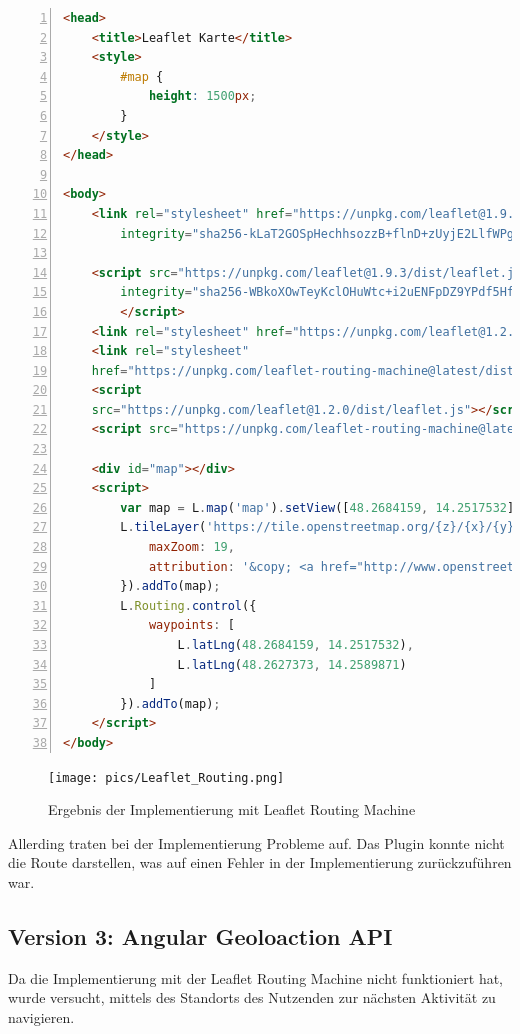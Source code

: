 \begin{lstlisting}[numbers=left,language=HTML,caption={Implementierung einer Karte mit Leaflet Routing Engine},label={lst:leafletmap}]
<head>
    <title>Leaflet Karte</title>
    <style>
        #map {
            height: 1500px;
        }
    </style>
</head>

<body>
    <link rel="stylesheet" href="https://unpkg.com/leaflet@1.9.3/dist/leaflet.css"
        integrity="sha256-kLaT2GOSpHechhsozzB+flnD+zUyjE2LlfWPgU04xyI=" crossorigin="" />

    <script src="https://unpkg.com/leaflet@1.9.3/dist/leaflet.js"
        integrity="sha256-WBkoXOwTeyKclOHuWtc+i2uENFpDZ9YPdf5Hf+D7ewM=" crossorigin="">
        </script>
    <link rel="stylesheet" href="https://unpkg.com/leaflet@1.2.0/dist/leaflet.css" />
    <link rel="stylesheet" 
    href="https://unpkg.com/leaflet-routing-machine@latest/dist/leaflet-routing-machine.css" />
    <script 
    src="https://unpkg.com/leaflet@1.2.0/dist/leaflet.js"></script>
    <script src="https://unpkg.com/leaflet-routing-machine@latest/dist/leaflet-routing-machine.js"></script>

    <div id="map"></div>
    <script>
        var map = L.map('map').setView([48.2684159, 14.2517532], 15);
        L.tileLayer('https://tile.openstreetmap.org/{z}/{x}/{y}.png', {
            maxZoom: 19,
            attribution: '&copy; <a href="http://www.openstreetmap.org/copyright">OpenStreetMap</a>'
        }).addTo(map);
        L.Routing.control({
            waypoints: [
                L.latLng(48.2684159, 14.2517532),
                L.latLng(48.2627373, 14.2589871)
            ]
        }).addTo(map);
    </script>
</body>
\end{lstlisting}

\begin{figure}[h]
    \centering
    \texttt{[image: pics/Leaflet\_Routing.png]}
    \caption{Ergebnis der Implementierung mit Leaflet Routing Machine}
\end{figure}

Allerding traten bei der Implementierung Probleme auf. Das Plugin konnte nicht die Route darstellen, was auf einen Fehler in der Implementierung zurückzuführen war.

\subsection{Version 3: Angular Geoloaction API}
Da die Implementierung mit der Leaflet Routing Machine nicht funktioniert hat, wurde versucht, mittels des Standorts des Nutzenden zur nächsten Aktivität zu navigieren. 

